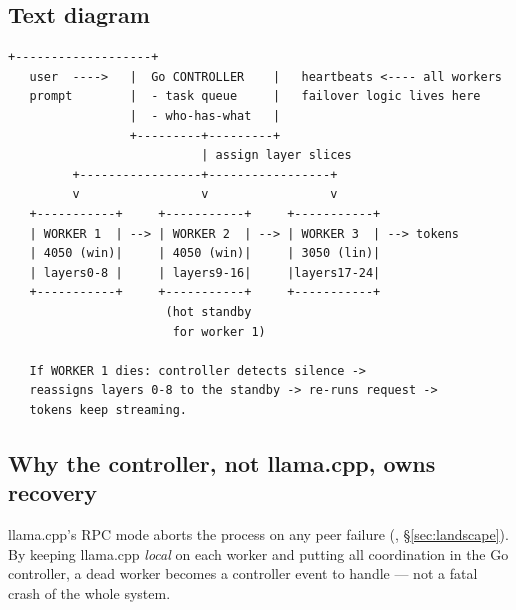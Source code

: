 \subsection{Text diagram}
\begin{lstlisting}[style=plain]
                 +-------------------+
   user  ---->   |  Go CONTROLLER    |   heartbeats <---- all workers
   prompt        |  - task queue     |   failover logic lives here
                 |  - who-has-what   |
                 +---------+---------+
                           | assign layer slices
         +-----------------+-----------------+
         v                 v                 v
   +-----------+     +-----------+     +-----------+
   | WORKER 1  | --> | WORKER 2  | --> | WORKER 3  | --> tokens
   | 4050 (win)|     | 4050 (win)|     | 3050 (lin)|
   | layers0-8 |     | layers9-16|     |layers17-24|
   +-----------+     +-----------+     +-----------+
                      (hot standby
                       for worker 1)

   If WORKER 1 dies: controller detects silence ->
   reassigns layers 0-8 to the standby -> re-runs request ->
   tokens keep streaming.
\end{lstlisting}

\subsection{Why the controller, not llama.cpp, owns recovery}
llama.cpp's RPC mode aborts the process on any peer failure (\VER,
\S\ref{sec:landscape}). By keeping llama.cpp \emph{local} on each worker and
putting all coordination in the Go controller, a dead worker becomes a
controller event to handle --- not a fatal crash of the whole system.
